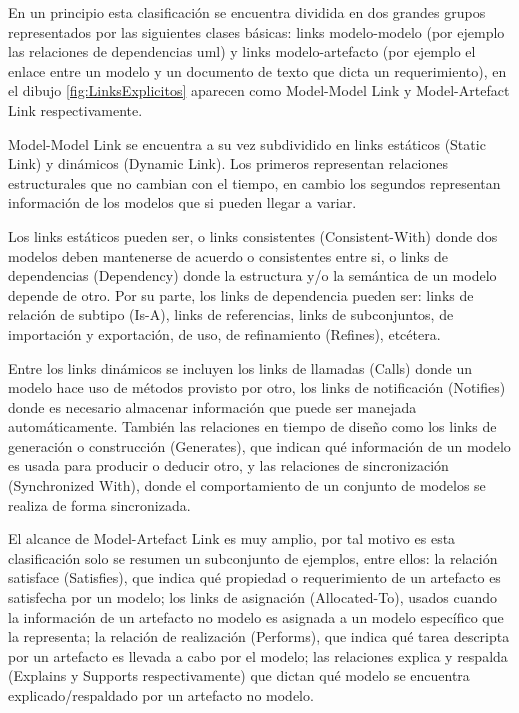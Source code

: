 \documentclass[a4paper,12pt,oneside,spanish]{book}
\begin{document}
En un principio esta clasificación se encuentra dividida en dos grandes grupos representados por las siguientes clases básicas: links modelo-modelo (por ejemplo las relaciones de dependencias \gls{uml}) y links modelo-artefacto (por ejemplo el enlace entre un modelo y un documento de texto que dicta un requerimiento), en el dibujo \ref{fig:LinksExplicitos} aparecen como Model-Model Link y Model-Artefact Link respectivamente.

Model-Model Link se encuentra a su vez subdividido en links estáticos (Static Link) y dinámicos (Dynamic Link). Los primeros representan relaciones estructurales que no cambian con el tiempo, en cambio los segundos representan información de los modelos que si pueden llegar a variar.

Los links estáticos pueden ser, o links consistentes (Consistent-With) donde dos modelos deben mantenerse de acuerdo o consistentes entre si, o links de dependencias (Dependency) donde la estructura y/o la semántica de un modelo depende de otro. Por su parte, los links de dependencia pueden ser: links de relación de subtipo (Is-A), links de referencias, links de subconjuntos, de importación y exportación, de uso, de refinamiento (Refines), etcétera.

Entre los links dinámicos se incluyen los links de llamadas (Calls) donde un modelo hace uso de métodos provisto por otro, los links de notificación (Notifies) donde es necesario almacenar información que puede ser manejada automáticamente. También las relaciones en tiempo de diseño como los links de generación o construcción (Generates), que indican qué información de un modelo es usada para producir o deducir otro, y las relaciones de sincronización (Synchronized With), donde el comportamiento de un conjunto de modelos se realiza de forma sincronizada.

El alcance de Model-Artefact Link es muy amplio, por tal motivo es esta clasificación solo se resumen un subconjunto de ejemplos, entre ellos: la relación satisface (Satisfies), que indica qué propiedad o requerimiento de un artefacto es satisfecha por un modelo; los links de asignación (Allocated-To), usados cuando la información de un artefacto no modelo es asignada a un modelo específico que la representa; la relación de realización (Performs), que indica qué tarea descripta por un artefacto es llevada a cabo por el modelo; las relaciones explica y respalda (Explains y Supports respectivamente) que dictan qué modelo se encuentra explicado/respaldado por un artefacto no modelo.
\end{document}

